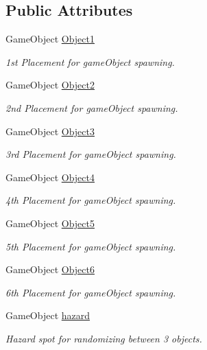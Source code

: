 \subsection*{Public Attributes}
\begin{DoxyCompactItemize}
\item 
Game\-Object \hyperlink{classGameController_ae2d31db5ff00946e41b2dcd7ddda941a}{Object1}
\begin{DoxyCompactList}\small\item\em 1st Placement for game\-Object spawning. \end{DoxyCompactList}\item 
Game\-Object \hyperlink{classGameController_ab5c9311e9997c3d8a34833b3760f28f8}{Object2}
\begin{DoxyCompactList}\small\item\em 2nd Placement for game\-Object spawning. \end{DoxyCompactList}\item 
Game\-Object \hyperlink{classGameController_a9956f5a361f097e051a144a2b787e5ca}{Object3}
\begin{DoxyCompactList}\small\item\em 3rd Placement for game\-Object spawning. \end{DoxyCompactList}\item 
Game\-Object \hyperlink{classGameController_a983e7aca0a381e25974cb6b941907f07}{Object4}
\begin{DoxyCompactList}\small\item\em 4th Placement for game\-Object spawning. \end{DoxyCompactList}\item 
Game\-Object \hyperlink{classGameController_a354cfdad1159788f59c1a1a7f0c812c2}{Object5}
\begin{DoxyCompactList}\small\item\em 5th Placement for game\-Object spawning. \end{DoxyCompactList}\item 
Game\-Object \hyperlink{classGameController_abdd174d29ced81c8cb34bdac98018e03}{Object6}
\begin{DoxyCompactList}\small\item\em 6th Placement for game\-Object spawning. \end{DoxyCompactList}\item 
Game\-Object \hyperlink{classGameController_a77c185a594a084fe342e8de517808654}{hazard}
\begin{DoxyCompactList}\small\item\em Hazard spot for randomizing between 3 objects. \end{DoxyCompactList}\item 

\end{DoxyCompactItemize}
